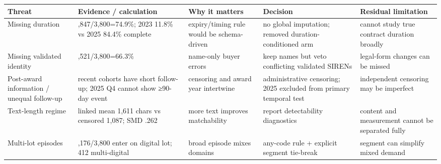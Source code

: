 {\def\LTcaptype{none} %
\begin{longtable}[]{@{}
  >{\raggedright\arraybackslash}p{}
  >{\raggedright\arraybackslash}p{}
  >{\raggedright\arraybackslash}p{}
  >{\raggedright\arraybackslash}p{}
  >{\raggedright\arraybackslash}p{}@{}}
\toprule\noalign{}
\begin{minipage}[b]{\linewidth}\raggedright
Threat
\end{minipage} & \begin{minipage}[b]{\linewidth}\raggedright
Evidence / calculation
\end{minipage} & \begin{minipage}[b]{\linewidth}\raggedright
Why it matters
\end{minipage} & \begin{minipage}[b]{\linewidth}\raggedright
Decision
\end{minipage} & \begin{minipage}[b]{\linewidth}\raggedright
Residual limitation
\end{minipage} \\
\midrule\noalign{}
\endhead
\bottomrule\noalign{}
\endlastfoot
Missing duration & 2,847/3,800=74.9\%; 2023 11.8\% vs 2025 84.4\%
complete & expiry/timing rule would be schema-driven & no global
imputation; removed duration-conditioned arm & cannot study true
contract duration broadly \\
Missing validated identity & 2,521/3,800=66.3\% & name-only buyer errors
& keep names but veto conflicting validated SIRENs & legal-form changes
can be missed \\
Post-award information / unequal follow-up & recent cohorts have short
follow-up; 2025 Q4 cannot show ≥90-day event & censoring and award year
intertwine & administrative censoring; 2025 excluded from primary
temporal test & independent censoring may be imperfect \\
Text-length regime & linked mean 1,611 chars vs censored 1,087; SMD .262
& more text improves matchability & report detectability diagnostics &
content and measurement cannot be separated fully \\
Multi-lot episodes & 1,176/3,800 enter on digital lot; 412 multi-digital
& broad episode mixes domains & any-code rule + explicit segment
tie-break & segment can simplify mixed demand \\

\end{longtable}}
